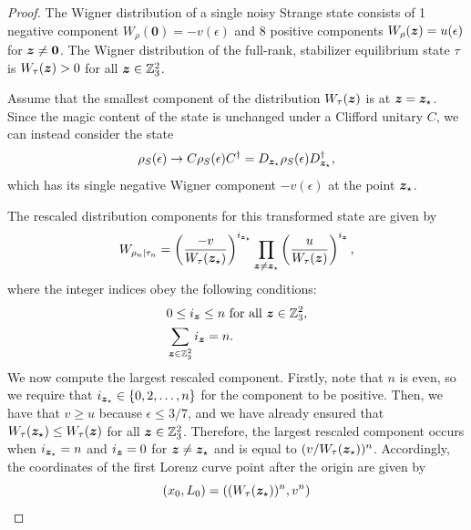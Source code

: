 \documentclass[pra,
aps,
twocolumn,
superscriptaddress,
groupedaddress,
nofootinbib,
reprint
]{revtex4-1}
\begin{document}
\begin{proof}
The Wigner distribution of a single noisy Strange state consists of 1 negative component $W_{\rho}(\mathbf{0}) = -v(\epsilon)$ and 8 positive components $W_{\rho}(\bm{z}) = u(\epsilon)$ for $\bm{z} \neq \bm{0}$.
The Wigner distribution of the full-rank, stabilizer equilibrium state $\tau$ is $W_{\tau}(\bm{z}) > 0$ for all $\bm{z} \in \mathbb{Z}_3^2$.

Assume that the smallest component of the distribution $W_\tau(\bm{z})$ is at $\bm{z}=\bm{z}_\star$. Since the magic content of the state is unchanged under a Clifford unitary $C$, we can instead consider the state
\begin{equation}
\rho_S(\epsilon) \rightarrow C \rho_S(\epsilon) C^\dagger = D_{\bm{z}_\star} \rho_S(\epsilon) D_{\bm{z}_\star}^\dagger,
\end{equation}
which has its single negative Wigner component $-v(\epsilon)$ at the point $\bm{z}_\star$.


The rescaled distribution components for this transformed state are given by
\begin{equation}
	W_{\rho_n|\tau_n} = \left(\frac{-v}{W_{\tau}(\bm{z}_\star)}\right)^{i_{\bm{z}_\star}} \prod_{\bm{z} \neq \bm{z}_\star} \left(\frac{u}{W_{\tau}(\bm{z})}\right)^{i_{\bm{z}}},
\end{equation}
where the integer indices obey the following conditions:
\begin{align}
&0 \leq i_{\bm{z}} \leq n \mbox{ for all } \bm{z} \in \mathbb{Z}_3^2, \nonumber \\
&\sum_{\bm{z} \in \mathbb{Z}_3^2} i_{\bm{z}} = n.
\end{align}
We now compute the largest rescaled component.
Firstly, note that $n$ is even, so we require that $i_{\bm{z}_\star} \in \{0,2,\dots,n\}$ for the component to be positive.
Then, we have that $v \geq u$ because $\epsilon \leq 3/7$, and we have already ensured that $W_{\tau}(\bm{z}_\star) \leq W_{\tau}(\bm{z})$ for all $\bm{z} \in \mathbb{Z}_3^2$.
Therefore, the largest rescaled component occurs when $i_{\bm{z}_{\star}} = n$ and $i_{\bm{z}} = 0$ for $\bm{z} \neq \bm{z}_\star$ and is equal to $(v/W_{\tau}(\bm{z}_\star))^n$.
Accordingly, the coordinates of the first Lorenz curve point after the origin are given by
\begin{equation}
	(x_0, L_0) = ((W_{\tau}(\bm{z}_\star))^n, v^n)
\end{equation}


\end{proof}
\end{document}
